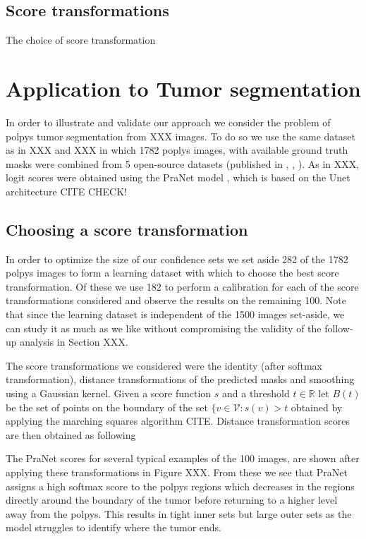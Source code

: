 \subsection{Score transformations}
The choice of score transformation

\section{Application to Tumor segmentation}
In order to illustrate and validate our approach we consider the problem of polpys tumor segmentation from XXX images. To do so we use the same dataset as in XXX and XXX in which 1782 poplys images, with available ground truth masks were combined from 5 open-source datasets (published in \cite{KVASIR2017}, \cite{Hyperkvasir2020} \cite{Bernal2012}, \cite{Silva2014}). As in XXX, logit scores were obtained using the PraNet model \cite{PraNet2020}, which is based on the Unet architecture CITE CHECK! 

\subsection{Choosing a score transformation}
In order to optimize the size of our confidence sets we set aside 282 of the 1782 polpys images to form a learning dataset with which to choose the best score transformation. Of these we use 182 to perform a calibration for each of the score transformations considered and observe the results on the remaining 100. Note that since the learning dataset is independent of the 1500 images set-aside, we can study it as much as we like without compromising the validity of the follow-up analysis in Section XXX. 

The score transformations we considered were the identity (after softmax transformation), distance transformations of the predicted masks and smoothing using a Gaussian kernel. Given a score function $s$ and a threshold $t \in \mathbb{R}$ let $B(t)$ be the set of points on the boundary of the set $\lbrace v \in \mathcal{V}: s(v) > t$ obtained by applying the marching squares algorithm CITE. Distance transformation scores are then obtained as following


The PraNet scores for several typical examples of the 100 images, are shown after applying these transformations in Figure XXX.  From these we see that PraNet assigns a high softmax score to the polpys regions which decreases in the regions directly around the  boundary of the tumor before returning to a higher level away from the polpys. This results in tight inner sets but large outer sets as the model struggles to identify where the tumor ends. 

